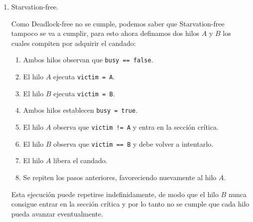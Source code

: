\begin{enumerate}
    \begin{enumerate}
        \item[$t_1$:] $A$ ejecuta la línea 7: \texttt{victim = A}.
        \item[$t_2$:] $A$ evalúa la línea 8: \texttt{busy == false} (nadie más ha tocado \texttt{busy}) $\Rightarrow$ sale del ciclo interno.
        \item[$t_3$:] $A$ ejecuta la línea 9: \texttt{busy = true}.
        \item[$t_4$:] $A$ evalúa la línea 10: \texttt{victim == A}? $\Rightarrow$ \textbf{verdadero} (nadie más escribió \texttt{victim}) $\Rightarrow$ el ciclo externo se repite.
        \item[$t_5$:] $A$ vuelve a la línea 7: \texttt{victim = A} (otra vez, sigue siendo su propio nombre).
        \item[$t_6$:] $A$ evalúa la línea 8: \texttt{busy == true} (él mismo lo puso en $t_3$, y nadie hará \texttt{unlock()} porque $A$ nunca llegó a la sección crítica) $\Rightarrow$ $A$ queda atrapado repitiendo \texttt{victim = A} para siempre.
    \end{enumerate}

    En pocas palabras $A$ nunca regresa de \texttt{lock()}, y ningún otro hilo completa pasos ya que sólo tenemos uno. Esto viola la definición de \textit{deadlock-free}, ya que el algoritmo necesita \emph{competencia} para poder avanzar. Como tenemos un solo hilo siempre es el último en escribir la nota, así que siempre se ve a sí mismo al revisarla, y por lo tanto nunca lo dejan pasar.
        
        \item \textcolor{dkgreen}{Starvation-free.}

        Como Deadlock-free no se cumple, podemos saber que Starvation-free tampoco se va a cumplir, para esto ahora definamos dos hilos $A$ y $B$ los cuales compiten por adquirir el candado:

        \begin{enumerate}
    \item Ambos hilos observan que \texttt{busy == false}.
    \item El hilo $A$ ejecuta \texttt{victim = A}.
    \item El hilo $B$ ejecuta \texttt{victim = B}.
    \item Ambos hilos establecen \texttt{busy = true}.
    \item El hilo $A$ observa que \texttt{victim != A} y entra
    en la sección crítica.
    \item El hilo $B$ observa que \texttt{victim == B} y debe
    volver a intentarlo.
    \item El hilo $A$ libera el candado.
    \item Se repiten los pasos anteriores, favoreciendo nuevamente
    al hilo $A$.
\end{enumerate}

Esta ejecución puede repetirse indefinidamente, de modo que el
hilo $B$ nunca consigue entrar en la sección crítica y por lo tanto no se cumple que cada hilo pueda avanzar eventualmente. 

    \end{enumerate}

